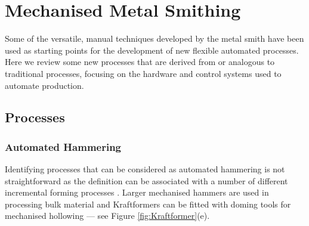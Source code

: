 


\newpage
\section{Mechanised Metal Smithing} \label{sec:Mechanised}

Some of the versatile, manual techniques developed by the metal smith have been used as starting points for the development of new flexible automated processes. Here we review some new processes that are derived from or analogous to traditional processes, focusing on the hardware and control systems used to automate production.


\subsection{Processes} \label{sec:MechanisedProcess}
\subsubsection{Automated Hammering} \label{sec:MechHammer}
Identifying processes that can be considered as automated hammering is not straightforward as the definition can be associated with a number of different incremental forming processes \citep{Emmens2010TheHistory}. Larger mechanised hammers are used in processing bulk material \citep{Lange1986HandbookForming} and Kraftformers can be fitted with doming tools for mechanised hollowing --- see Figure \ref{fig:Kraftformer}(e).

